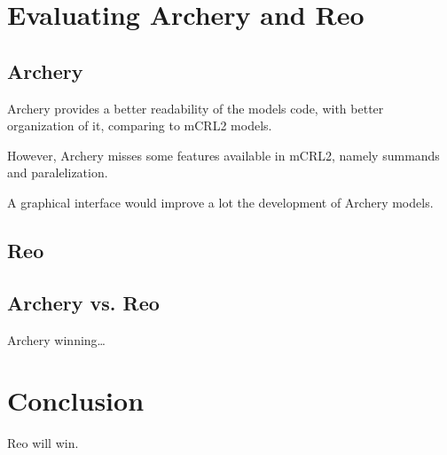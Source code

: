 \documentclass[a4paper]{article}
\newcommand{\ar}{Archery\xspace}
\newcommand{\re}{Reo\xspace}
\newcommand{\mcrl}{mCRL2\xspace}
\begin{document}
%
%
\section{Evaluating \ar and \re}

\subsection{\ar}

\ar provides a better readability of the models code, with better organization of it,
comparing to \mcrl models.

However, \ar misses some features available in \mcrl, namely summands and paralelization.

A graphical interface would improve a lot the development of Archery models.

\subsection{\re}

\subsection{\ar vs. \re}

\ar winning\dots

%
%
\section{Conclusion}

\re will win. 
\end{document}

